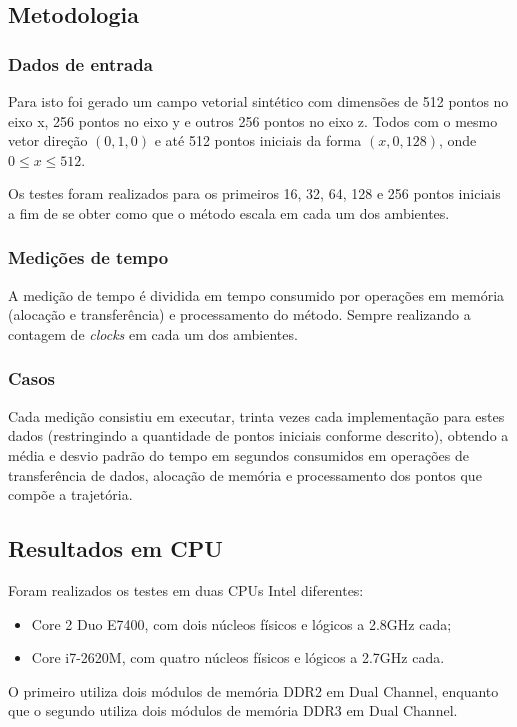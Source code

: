   \subsection{Metodologia}
    \subsubsection{Dados de entrada}
    Para isto foi gerado um campo vetorial sintético com dimensões de 512 pontos no eixo x, 256 pontos no eixo y e outros 256 pontos no eixo z. Todos com o mesmo vetor direção $(0, 1, 0)$ e até 512 pontos iniciais da forma $(x, 0, 128)$, onde $0 \leq x \leq 512$.
    
    Os testes foram realizados para os primeiros 16, 32, 64, 128 e 256 pontos iniciais a fim de se obter como que o método escala em cada um dos ambientes.
    
    \subsubsection{Medições de tempo}
    A medição de tempo é dividida em tempo consumido por operações em memória (alocação e transferência) e processamento do método. Sempre realizando a contagem de \textit{clocks} em cada um dos ambientes.
    
    \subsubsection{Casos}
    Cada medição consistiu em executar, trinta vezes cada implementação para estes dados (restringindo a quantidade de pontos iniciais conforme descrito), obtendo a média e desvio padrão do tempo em segundos consumidos em operações de transferência de dados, alocação de memória e processamento dos pontos que compõe a trajetória.    

  \subsection{Resultados em CPU}
  Foram realizados os testes em duas CPUs Intel diferentes:
  \begin{itemize}
    \item Core 2 Duo E7400, com dois núcleos físicos e lógicos a 2.8GHz cada;
    \item Core i7-2620M, com quatro núcleos físicos e lógicos a 2.7GHz cada.
  \end{itemize}
  
  O primeiro utiliza dois módulos de memória DDR2 em Dual Channel, enquanto que o segundo utiliza dois módulos de memória DDR3 em Dual Channel.

